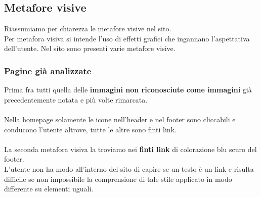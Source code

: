\documentclass[../Relazione.tex]{subfiles}
\begin{document}
	\subsection{Metafore visive}
		Riassumiamo per chiarezza le metafore visive nel sito.\\
		Per metafora visiva si intende l'uso di effetti grafici che ingannano l'aspettativa dell'utente. Nel sito sono presenti varie metafore visive.
		\subsubsection{Pagine già analizzate}
		Prima fra tutti quella delle \textbf{immagini non riconosciute come immagini} già precedentemente notata e più volte rimarcata.\\\\			
		Nella homepage solamente le icone nell'header e nel footer sono cliccabili e conducono l'utente altrove, tutte le altre sono finti link.\\\\			
		La seconda metafora visiva la troviamo nei \textbf{finti link} di colorazione blu scuro del footer.\\L'utente non ha modo all'interno del sito di capire se un testo è un link e risulta difficile se non impossibile la comprensione di tale stile applicato in modo differente su elementi uguali.
\end{document}
